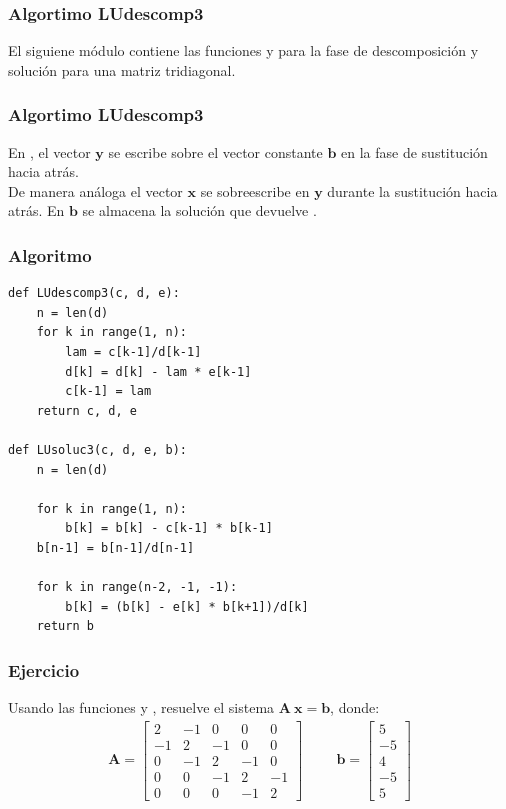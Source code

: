 \documentclass[12pt]{beamer}
\begin{document}
\begin{frame}
\frametitle{Algortimo LUdescomp3}
El siguiene módulo contiene las funciones  y  para la fase de descomposición y solución para una matriz tridiagonal.
\end{frame}
\begin{frame}
\frametitle{Algortimo LUdescomp3}
En , el vector $\mathbf{y}$ se escribe sobre el vector constante $\mathbf{b}$ en la fase de sustitución hacia atrás.
\\
\bigskip
\pause
De manera análoga el vector $\mathbf{x}$ se sobreescribe en $\mathbf{y}$ durante la sustitución hacia atrás. \pause En $\mathbf{b}$ se almacena la solución que devuelve .
\end{frame}
\begin{frame}
\frametitle{Algoritmo}
\begin{lstlisting}[caption=Algoritmo para la solución tridiagonal]
def LUdescomp3(c, d, e):
    n = len(d)
    for k in range(1, n):
        lam = c[k-1]/d[k-1]
        d[k] = d[k] - lam * e[k-1]
        c[k-1] = lam
    return c, d, e
    
def LUsoluc3(c, d, e, b):
    n = len(d)

    for k in range(1, n):
        b[k] = b[k] - c[k-1] * b[k-1]
    b[n-1] = b[n-1]/d[n-1]

    for k in range(n-2, -1, -1):
        b[k] = (b[k] - e[k] * b[k+1])/d[k]
    return b
\end{lstlisting}
\end{frame}
\begin{frame}
\frametitle{Ejercicio}
Usando las funciones  y , resuelve el sistema $\mathbf{A \: x} = \mathbf{b}$, donde:
\renewcommand{\arraystretch}{0.9}
\begin{align*}
\mathbf{A} =  \begin{bmatrix}
2 & -1 & 0 & 0 & 0 \\
-1 & 2 & -1 & 0 & 0 \\
0 & -1 & 2 & -1 & 0 \\
0 & 0 & -1 & 2 & -1 \\
0 & 0 & 0 & -1 & 2
\end{bmatrix}
\hspace{1cm}
\mathbf{b} =
\begin{bmatrix}
5 \\
-5 \\
4 \\
-5 \\
5
\end{bmatrix}
\end{align*}
\end{frame}
\end{document}
